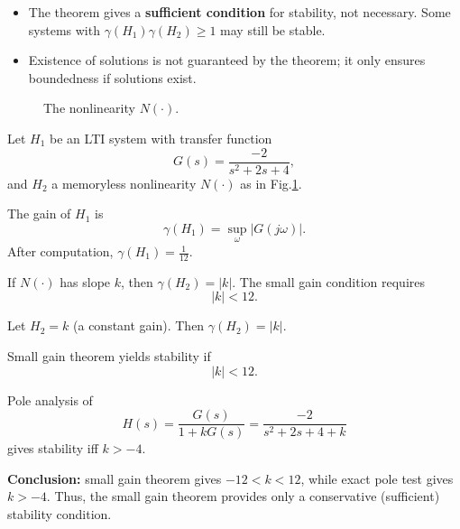 \begin{remark}
\begin{itemize}
    \item The theorem gives a \textbf{sufficient condition} for stability, not necessary. Some systems with $\gamma(H_1)\gamma(H_2)\geq 1$ may still be stable.
    \item Existence of solutions is not guaranteed by the theorem; it only ensures boundedness if solutions exist.
\end{itemize}
\end{remark}

\begin{example}
\begin{figure}[h!]
\centering
{}
\caption{The nonlinearity $N(\cdot)$.}
\label{fig:nonlinear}
\end{figure}

Let $H_1$ be an LTI system with transfer function
\[
G(s) = \frac{-2}{s^2+2s+4},
\]
and $H_2$ a memoryless nonlinearity $N(\cdot)$ as in Fig.\ref{fig:nonlinear}.

The gain of $H_1$ is
\[
\gamma(H_1) = \sup_{\omega} |G(j\omega)|.
\]
After computation, $\gamma(H_1) = \tfrac{1}{12}$.

If $N(\cdot)$ has slope $k$, then $\gamma(H_2) = |k|$.  
The small gain condition requires
\[
|k| < 12.
\]
\end{example}

\begin{example}
Let $H_2 = k$ (a constant gain). Then $\gamma(H_2)=|k|$.

Small gain theorem yields stability if
\[
|k| < 12.
\]

Pole analysis of
\[
H(s) = \frac{G(s)}{1+kG(s)} = \frac{-2}{s^2+2s+4+k}
\]
gives stability iff $k>-4$.

\textbf{Conclusion:} small gain theorem gives $-12<k<12$, while exact pole test gives $k>-4$. Thus, the small gain theorem provides only a conservative (sufficient) stability condition.
\end{example}

